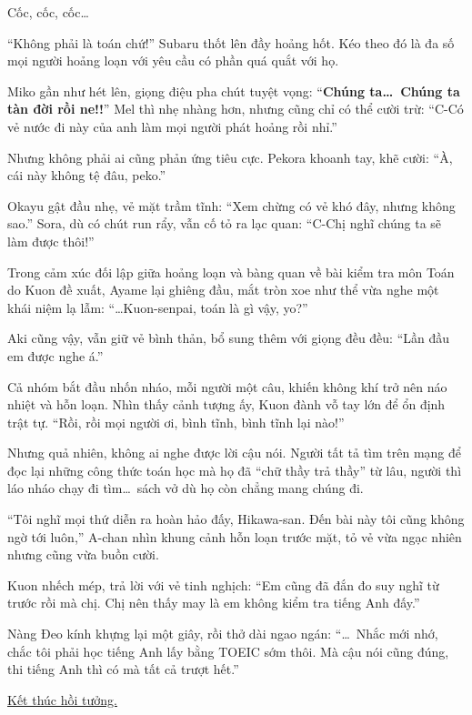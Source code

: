 \documentclass[../main.tex]{subfiles}
\begin{document}
Cốc, cốc, cốc\dots

``Không phải là toán chứ!'' Subaru thốt lên đầy hoảng hốt. Kéo theo đó là đa số mọi người hoảng loạn với yêu cầu có phần quá quắt với họ.

Miko gần như hét lên, giọng điệu pha chút tuyệt vọng: ``\textbf{Chúng ta\dots\ Chúng ta tàn đời rồi ne!!}'' Mel thì nhẹ nhàng hơn, nhưng cũng chỉ có thể cười trừ: ``C-Có vẻ nước đi này của anh làm mọi người phát hoảng rồi nhỉ.''

Nhưng không phải ai cũng phản ứng tiêu cực. Pekora khoanh tay, khẽ cười: ``À, cái này không tệ đâu, peko.''

Okayu gật đầu nhẹ, vẻ mặt trầm tĩnh: ``Xem chừng có vẻ khó đây, nhưng không sao.'' Sora, dù có chút run rẩy, vẫn cố tỏ ra lạc quan: ``C-Chị nghĩ chúng ta sẽ làm được thôi!''

Trong cảm xúc đối lập giữa hoảng loạn và bàng quan về bài kiểm tra môn Toán do Kuon đề xuất, Ayame lại ghiêng đầu, mắt tròn xoe như thể vừa nghe một khái niệm lạ lẫm: ``\dots Kuon-senpai, toán là gì vậy, yo?''

Aki cũng vậy, vẫn giữ vẻ bình thản, bổ sung thêm với giọng đều đều: ``Lần đầu em được nghe á.''

Cả nhóm bắt đầu nhốn nháo, mỗi người một câu, khiến không khí trở nên náo nhiệt và hỗn loạn. Nhìn thấy cảnh tượng ấy, Kuon đành vỗ tay lớn để ổn định trật tự. ``Rồi, rồi mọi người ơi, bình tĩnh, bình tĩnh lại nào!''

Nhưng quả nhiên, không ai nghe được lời cậu nói. Người tất tả tìm trên mạng để đọc lại những công thức toán học mà họ đã ``chữ thầy trả thầy'' từ lâu, người thì láo nháo chạy đi tìm\dots\ sách vở dù họ còn chẳng mang chúng đi.

``Tôi nghĩ mọi thứ diễn ra hoàn hảo đấy, Hikawa-san. Đến bài này tôi cũng không ngờ tới luôn,'' A-chan nhìn khung cảnh hỗn loạn trước mặt, tỏ vẻ vừa ngạc nhiên nhưng cũng vừa buồn cười.

Kuon nhếch mép, trả lời với vẻ tinh nghịch: ``Em cũng đã đắn đo suy nghĩ từ trước rồi mà chị. Chị nên thấy may là em không kiểm tra tiếng Anh đấy.''

Nàng Đeo kính khựng lại một giây, rồi thở dài ngao ngán: ``\dots\ Nhắc mới nhớ, chắc tôi phải học tiếng Anh lấy bằng TOEIC sớm thôi. Mà cậu nói cũng đúng, thi tiếng Anh thì có mà tất cả trượt hết.''

\begin{center}
    \uline{Kết thúc hồi tưởng.}
\end{center}
\end{document}
